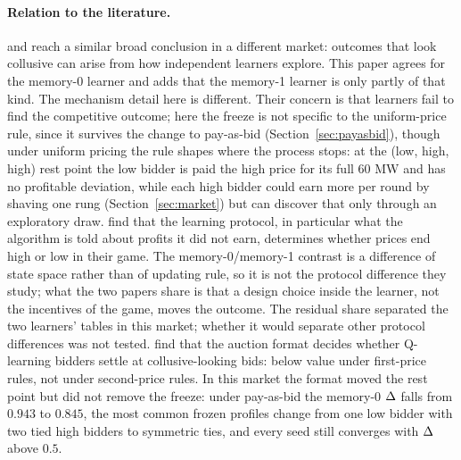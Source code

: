 \paragraph{Relation to the literature.}
\citet{abada2023} and \citet{abada2024} reach a similar broad conclusion in a different market: outcomes that look collusive can arise from how independent learners explore. This paper agrees for the memory-0 learner and adds that the memory-1 learner is only partly of that kind. The mechanism detail here is different. Their concern is that learners fail to find the competitive outcome; here the freeze is not specific to the uniform-price rule, since it survives the change to pay-as-bid (Section~\ref{sec:payasbid}), though under uniform pricing the rule shapes where the process stops: at the (low, high, high) rest point the low bidder is paid the high price for its full 60 MW and has no profitable deviation, while each high bidder could earn  more per round by shaving one rung (Section~\ref{sec:market}) but can discover that only through an exploratory draw. \citet{asker2022} find that the learning protocol, in particular what the algorithm is told about profits it did not earn, determines whether prices end high or low in their game. The memory-0/memory-1 contrast is a difference of state space rather than of updating rule, so it is not the protocol difference they study; what the two papers share is that a design choice inside the learner, not the incentives of the game, moves the outcome. The residual share separated the two learners' tables in this market; whether it would separate other protocol differences was not tested. \citet{banchio2022} find that the auction format decides whether Q-learning bidders settle at collusive-looking bids: below value under first-price rules, not under second-price rules. In this market the format moved the rest point but did not remove the freeze: under pay-as-bid the memory-0 $\Delta$ falls from $0.943$ to $0.845$, the most common frozen profiles change from one low bidder with two tied high bidders to symmetric ties, and every seed still converges with $\Delta$ above $0.5$.

